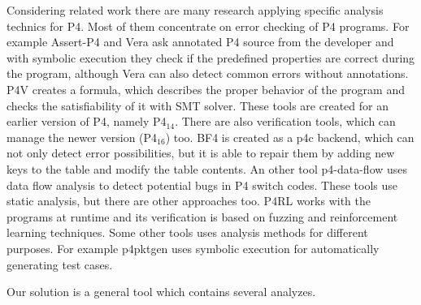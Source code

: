 \documentclass[sigconf]{acmart}
\begin{document}
	Considering related work there are many research applying specific analysis technics for P4. Most of them concentrate on error checking of P4 programs. For example Assert-P4 \cite{assertp4} and Vera \cite{vera} ask annotated P4 source from the developer and with symbolic execution they check if the predefined properties are correct during the program, although Vera can also detect common errors without annotations. P4V \cite{p4v} creates a formula, which describes the proper behavior of the program and checks the satisfiability of it with SMT solver. These tools are created for an earlier version of P4, namely P4$_\text{14}$. There are also verification tools, which can manage the newer version (P4$_\text{16}$) too. BF4 \cite{bf4} is created as a p4c backend, which can not only detect error possibilities, but it is able to repair them by adding new keys to the table and modify the table contents. An other tool p4-data-flow \cite{p4dataflow} uses data flow analysis to detect potential bugs in P4 switch codes.
	These tools use static analysis, but there are other approaches too. P4RL \cite{p4rl} works with the programs at runtime and its verification is based on fuzzing and reinforcement learning techniques.
	Some other tools uses analysis methods for different purposes. For example p4pktgen \cite{p4pktgen} uses symbolic execution for automatically generating test cases.  
	 
	
	Our solution is a general tool which contains several analyzes.	
	
	
  
\end{document}
